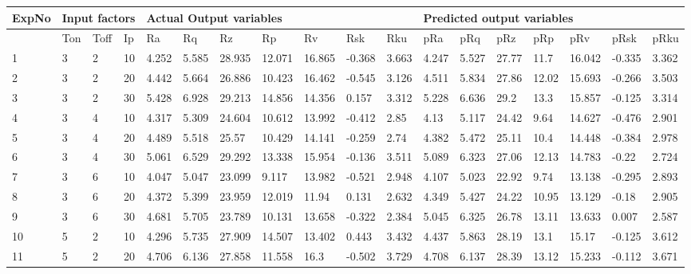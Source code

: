 \documentclass{interact}
\begin{document}
\begin{landscape}
    \centering
    \begin{tabular}{|l|l|l|l|l|l|l|l|l|l|l|l|l|l|l|l|l|l|}
    \hline
        ExpNo & \multicolumn{3}{l|}{Input factors} & \multicolumn{7}{l|}{ Actual Output variables}&\multicolumn{7}{l|}{ Predicted output variables}\\ \hline
    
        ~ & Ton & Toff & Ip & Ra & Rq & Rz & Rp & Rv & Rsk & Rku & pRa & pRq & pRz & pRp & pRv & pRsk & pRku \\ \hline
        1 & 3 & 2 & 10 & 4.252 & 5.585 & 28.935 & 12.071 & 16.865 & -0.368 & 3.663 & 4.247 & 5.527 & 27.77 & 11.7 & 16.042 & -0.335 & 3.362 \\ \hline
        2 & 3 & 2 & 20 & 4.442 & 5.664 & 26.886 & 10.423 & 16.462 & -0.545 & 3.126 & 4.511 & 5.834 & 27.86 & 12.02 & 15.693 & -0.266 & 3.503 \\ \hline
        3 & 3 & 2 & 30 & 5.428 & 6.928 & 29.213 & 14.856 & 14.356 & 0.157 & 3.312 & 5.228 & 6.636 & 29.2 & 13.3 & 15.857 & -0.125 & 3.314 \\ \hline
        4 & 3 & 4 & 10 & 4.317 & 5.309 & 24.604 & 10.612 & 13.992 & -0.412 & 2.85 & 4.13 & 5.117 & 24.42 & 9.64 & 14.627 & -0.476 & 2.901 \\ \hline
        5 & 3 & 4 & 20 & 4.489 & 5.518 & 25.57 & 10.429 & 14.141 & -0.259 & 2.74 & 4.382 & 5.472 & 25.11 & 10.4 & 14.448 & -0.384 & 2.978 \\ \hline
        6 & 3 & 4 & 30 & 5.061 & 6.529 & 29.292 & 13.338 & 15.954 & -0.136 & 3.511 & 5.089 & 6.323 & 27.06 & 12.13 & 14.783 & -0.22 & 2.724 \\ \hline
        7 & 3 & 6 & 10 & 4.047 & 5.047 & 23.099 & 9.117 & 13.982 & -0.521 & 2.948 & 4.107 & 5.023 & 22.92 & 9.74 & 13.138 & -0.295 & 2.893 \\ \hline
        8 & 3 & 6 & 20 & 4.372 & 5.399 & 23.959 & 12.019 & 11.94 & 0.131 & 2.632 & 4.349 & 5.427 & 24.22 & 10.95 & 13.129 & -0.18 & 2.905 \\ \hline
        9 & 3 & 6 & 30 & 4.681 & 5.705 & 23.789 & 10.131 & 13.658 & -0.322 & 2.384 & 5.045 & 6.325 & 26.78 & 13.11 & 13.633 & 0.007 & 2.587 \\ \hline
        10 & 5 & 2 & 10 & 4.296 & 5.735 & 27.909 & 14.507 & 13.402 & 0.443 & 3.432 & 4.437 & 5.863 & 28.19 & 13.1 & 15.17 & -0.125 & 3.612 \\ \hline
        11 & 5 & 2 & 20 & 4.706 & 6.136 & 27.858 & 11.558 & 16.3 & -0.502 & 3.729 & 4.708 & 6.137 & 28.39 & 13.12 & 15.233 & -0.112 & 3.671 \\ \hline

\end{tabular}
\end{landscape}
\end{document}
